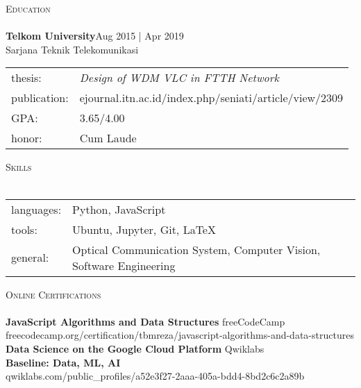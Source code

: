 \documentclass[a4paper]{article}
\newcommand{\lineunder} {
    \vspace*{-8pt} \\
    \hspace*{-18pt} \hrulefill \\
}
\newcommand{\header} [1] {
    {\hspace*{-18pt}\vspace*{6pt} \textsc{#1}}
    \vspace*{-6pt} \lineunder
}
\begin{document}
\vspace*{2mm}

\header{Education}
\textbf{Telkom University}\hfill Aug 2015 | Apr 2019\\
Sarjana Teknik Telekomunikasi\\


\begin{tabular}{ l l }
	thesis:       & \textit{Design of WDM VLC in FTTH Network}\\
	publication:  & ejournal.itn.ac.id/index.php/seniati/article/view/2309\\
  GPA:          & 3.65/4.00\\ 
  honor:        & Cum Laude\\
\end{tabular}
\vspace{2mm}

\header{Skills}
\begin{tabular}{ l l }
	languages:  & Python, JavaScript\\
  tools:      & Ubuntu, Jupyter, Git, \LaTeX\\        
  general:    & Optical Communication System, Computer Vision, Software Engineering\\                   
\end{tabular}
\vspace{2mm}

\header{Online Certifications}
\textbf{JavaScript Algorithms and Data Structures} \hfill freeCodeCamp\\
freecodecamp.org/certification/tbmreza/javascript-algorithms-and-data-structures\\
\vspace*{2mm}
\textbf{Data Science on the Google Cloud
Platform} \hfill Qwiklabs\\
\textbf{Baseline: Data, ML, AI}\\
qwiklabs.com/public\_profiles/a52e3f27-2aaa-405a-bdd4-8bd2c6c2a89b\\


\vspace*{2mm}

\ 
\end{document}
